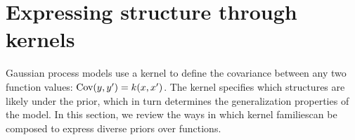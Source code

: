 \documentclass[twoside]{article}
\renewcommand{\fTBD}[1]{}
\begin{document}

\section{Expressing structure through kernels} 
\label{sec:Structure}


\fTBD{Define $\GP\sim\dots$ here?}
Gaussian process models use a kernel to define the covariance between any two function values: ${\textrm{Cov}(y, y') = k(x,x')}$.
The kernel specifies which structures are likely under the \gp{} prior, which in turn determines the generalization properties of the model.
%
%
In this section, we review the ways in which kernel families\footnotemark can be composed to express diverse priors over functions. 
\end{document}
